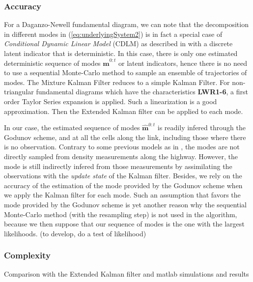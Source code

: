 \subsubsection{Accuracy}

For a Daganzo-Newell fundamental diagram, we can note that the decomposition in different modes in (\ref{eq:underlyingSystem2}) is in fact a special case of \textit{Conditional Dynamic Linear Model} (CDLM) as described in \cite{Chen2000} with a discrete latent indicator that is deterministic. In this case, there is only one estimated deterministic sequence of modes $\hat{\boldsymbol m}^{0:t}$ or latent indicators, hence there is no need to use a sequential Monte-Carlo method to sample an ensemble of trajectories of modes. The Mixture Kalman Filter \cite{Chen2000} reduces to a simple Kalman Filter. For non-triangular fundamental diagrams which have the characteristics \textbf{LWR1-6}, a first order Taylor Series expansion is applied. Such a linearization is a good approximation. Then the Extended Kalman filter can be applied to each mode.

In our case, the estimated sequence of modes $\hat{\boldsymbol m}^{0:t}$ is readily infered through the Godunov scheme, and at all the cells along the link, including those where there is no observation. Contrary to some previous models as in \cite{Munoz2003}, the modes are not directly sampled from density measurements along the highway. However, the mode is still indirectly infered from those measurements by assimilating the observations with the \textit{update state} of the Kalman filter. Besides, we rely on the accuracy of the estimation of the mode provided by the Godunov scheme when we apply the Kalman filter for each mode. Such an assumption that favors the mode provided by the Godunov scheme is yet another reason why the sequential Monte-Carlo method (with the resampling step) is not used in the algorithm, because we then suppose that our sequence of modes is the one with the largest likelihoods. (to develop, do a test of likelihood)

\subsubsection{Complexity}

Comparison with the Extended Kalman filter and matlab simulations and results